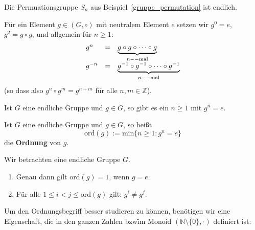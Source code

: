 \begin{beispiel} Die Permuationsgruppe $S_n$ aus Beispiel~\ref{gruppe_permutation} ist endlich. 
\end{beispiel}

\medbreak

Für ein Element $g \in (G, \circ)$ mit neutralem Element $e$ setzen wir $g^0 = e$, $g^2 = g \circ g$, und 
allgemein für $n \geq 1$:
  $$ \begin{array} {l c l}
  g^n & = & \underbrace{g \circ g \circ \cdots \circ g}_{n--\textrm{mal}} \\
  g^{-n} & = & \underbrace{g^{-1} \circ g^{-1} \circ \cdots \circ g^{-1}}_{n--\textrm{mal}}
  \end{array} $$
(so dass also $g^n \circ g^m = g^{n+m}$ für alle $n, m \in \mathbb Z$). 

\begin{lemma}\label{gruppe_endl_ordnung1} Ist $G$ eine endliche Gruppe und $g \in G$, so gibt es ein $n \geq 1$ 
mit $g^n = e$.
\end{lemma}


\medbreak

\begin{definition} Ist $G$ eine endliche Gruppe und $g \in G$, so heißt 
  $$ \textrm{ord}(g) := \textrm{min} \{ n \geq 1: g^n = e \} $$
die \textbf{Ordnung} von $g$.
\end{definition}

\begin{notiz}\label{gruppe_ordnung_distinkt} Wir betrachten eine endliche Gruppe $G$. 

\begin{enumerate}
\item Genau dann gilt $\textrm{ord}(g) = 1$, wenn $g = e$.
\item Für alle $1 \leq i < j \leq \textrm{ord}(g)$ gilt: $g^i \neq g^j$.
\end{enumerate}
\end{notiz} 

Um den Ordnungsbegriff besser studieren zu können, benötigen wir eine Eigenschaft, die in den ganzen Zahlen 
bzw\. im Monoid $(\mathbb N \setminus \{0 \}, \cdot )$ definiert ist:


